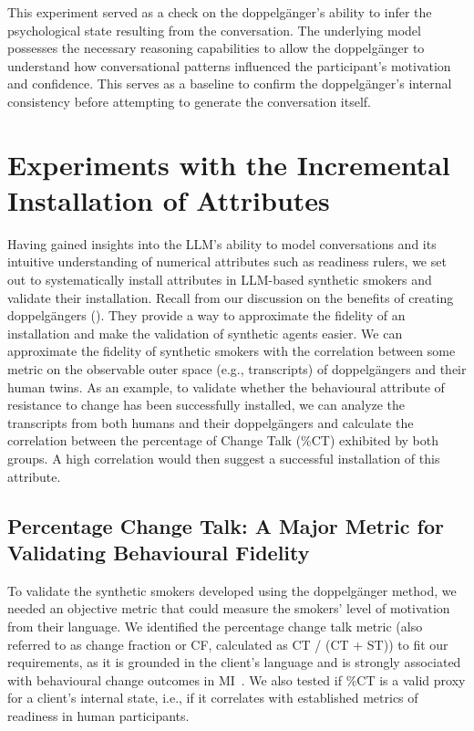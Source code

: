 This experiment served as a check on the doppelgänger's ability to infer the psychological state resulting from the conversation. The underlying model possesses the necessary reasoning capabilities to allow the doppelgänger to understand how conversational patterns influenced the participant's motivation and confidence. This serves as a baseline to confirm the doppelgänger's internal consistency before attempting to generate the conversation itself.



\section{Experiments with the Incremental Installation of Attributes}
Having gained insights into the LLM's ability to model conversations and its intuitive understanding of numerical attributes such as readiness rulers, we set out to systematically install attributes in LLM-based synthetic smokers and validate their installation. Recall from our discussion on the benefits of creating doppelgängers (). They provide a way to approximate the fidelity of an installation and make the validation of synthetic agents easier. We can approximate the fidelity of synthetic smokers with the correlation between some metric on the observable outer space (e.g., transcripts) of doppelgängers and their human twins. As an example, to validate whether the behavioural attribute of resistance to change has been successfully installed, we can analyze the transcripts from both humans and their doppelgängers and calculate the correlation between the percentage of Change Talk (\%CT) exhibited by both groups. A high correlation would then suggest a successful installation of this attribute.


\subsection*{Percentage Change Talk: A Major Metric for Validating Behavioural Fidelity}

To validate the synthetic smokers developed using the doppelgänger method, we needed an objective metric that could measure the smokers' level of motivation from their language.
We identified the percentage change talk metric (also referred to as change fraction or CF, calculated as CT / (CT + ST)) to fit our requirements, as it is grounded in the client's language and is strongly associated with behavioural change outcomes in MI~\cite{Barnett2014,Houck2018,Moyers2009,Baer2008}.
We also tested if \%CT is a valid proxy for a client's internal state, i.e., if it correlates with established metrics of readiness in human participants.

